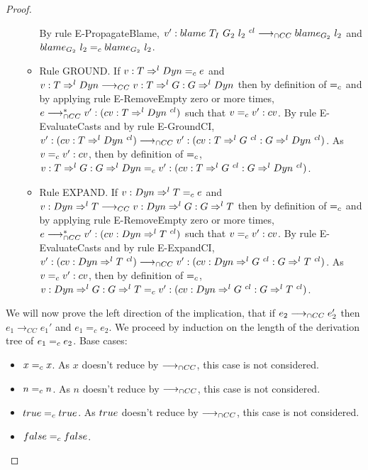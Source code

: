 \documentclass[a4paper]{article}
\begin{document}
\begin{proof}
\begin{itemize}
\begin{itemize}
        By rule E-PropagateBlame, $v' : blame\ T_I\ G_2\ l_2\ ^{cl} \longrightarrow_{\cap CC} blame_{G_2}\ l_2$ and $blame_{G_2}\ l_2 =_c blame_{G_2}\ l_2$.
        \item Rule GROUND.
        If $v : T \Rightarrow^l Dyn =_c e$ and $v : T \Rightarrow^l Dyn \longrightarrow_{CC} v : T \Rightarrow^l G : G \Rightarrow^l Dyn$ then by definition of $=_c$ and by applying rule E-RemoveEmpty zero or more times, $e \longrightarrow_{\cap CC}^* v' : (cv : T \Rightarrow^l Dyn\ ^{cl})$ such that $v =_c v' : cv$.
        By rule E-EvaluateCasts and by rule E-GroundCI, $v' : (cv : T \Rightarrow^l \Dyn\ ^{cl}) \gios v' : (cv : T \Rightarrow^l G\ ^{cl} : G \Rightarrow^l \Dyn\ ^{cl})$.
        As $v =_c v' : cv$, then by definition of $=_c$, $v : T \Rightarrow^l G : G \Rightarrow^l Dyn =_c v' : (cv : T \Rightarrow^l G\ ^{cl} : G \Rightarrow^l Dyn\ ^{cl})$.
        \item Rule EXPAND.
        If $v : Dyn \Rightarrow^l T =_c e$ and $v : Dyn \Rightarrow^l T \longrightarrow_{CC} v : Dyn \Rightarrow^l G : G \Rightarrow^l T$ then by definition of $=_c$ and by applying rule E-RemoveEmpty zero or more times, $e \longrightarrow_{\cap CC}^* v' : (cv : Dyn \Rightarrow^l T\ ^{cl})$ such that $v =_c v' : cv$.
        By rule E-EvaluateCasts and by rule E-ExpandCI, $v' : (cv : Dyn \Rightarrow^l T\ ^{cl}) \longrightarrow_{\cap CC} v' : (cv : Dyn \Rightarrow^l G\ ^{cl} : G \Rightarrow^l T\ ^{cl})$.
        As $v =_c v' : cv$, then by definition of $=_c$, $v : Dyn \Rightarrow^l G : G \Rightarrow^l T =_c v' : (cv : Dyn \Rightarrow^l G\ ^{cl} : G \Rightarrow^l T\ ^{cl})$.
    \end{itemize}
\end{itemize}
We will now prove the left direction of the implication, that if $e_2 \longrightarrow_{\cap CC} e_2'$ then $e_1 \longrightarrow_{CC} e_1'$ and $e_1 =_{c} e_2$.
We proceed by induction on the length of the derivation tree of $e_1 =_c e_2$.
Base cases:
\begin{itemize}
    \item $x =_c x$.
    As $x$ doesn't reduce by $\longrightarrow_{\cap CC}$, this case is not considered.
    \item $n =_c n$.
    As $n$ doesn't reduce by $\longrightarrow_{\cap CC}$, this case is not considered.
    \item $true =_c true$.
    As $true$ doesn't reduce by $\longrightarrow_{\cap CC}$, this case is not considered.
    \item $false =_c false$.

\end{itemize}
\end{proof}
\end{document}
